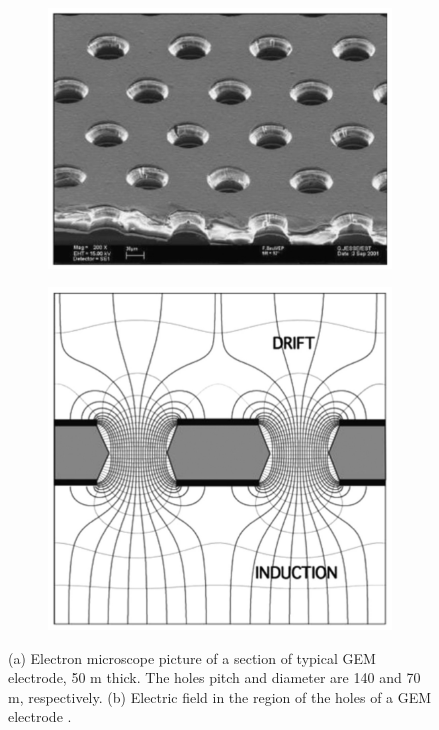 \begin{figure}[h!]
	\centering
	\begin{subfigure}[b]{0.44\linewidth}
		\includegraphics[width=\linewidth]{figures/gem_pic.png}
		\caption{}
	\end{subfigure}
	\begin{subfigure}[b]{0.44\textwidth}
		\includegraphics[width=\linewidth]{figures/gem_field.png}
		\caption{}
	\end{subfigure}
	\caption[(a) Electron microscope picture of a section of typical GEM electrode, 50 \textmu m thick. The holes pitch and diameter are 140 and 70 \textmu m, respectively. (b) Electric field in the region of the holes of a GEM electrode.]{(a) Electron microscope picture of a section of typical GEM electrode, 50 \textmu m thick. The holes pitch and diameter are 140 and 70 \textmu m, respectively\cite{GEM}. (b) Electric field in the region of the holes of a GEM electrode \cite{GEM}.}
	\label{fig:gem}
\end{figure}

